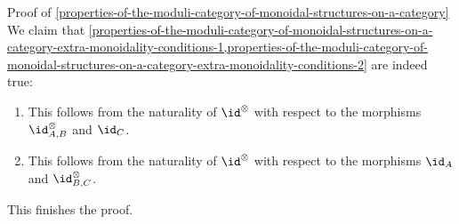 \begin{Proof}{Proof of \cref{properties-of-the-moduli-category-of-monoidal-structures-on-a-category}}%
    We claim that \cref{properties-of-the-moduli-category-of-monoidal-structures-on-a-category-extra-monoidality-conditions-1,properties-of-the-moduli-category-of-monoidal-structures-on-a-category-extra-monoidality-conditions-2} are indeed true:
    \begin{enumerate}
        \item{}This follows from the naturality of $\id^{\otimes}$ with respect to the morphisms $\id^{\otimes}_{A,B}$ and $\id_{C}$.
        \item{}This follows from the naturality of $\id^{\otimes}$ with respect to the morphisms $\id_{A}$ and $\id^{\otimes}_{B,C}$.
    \end{enumerate}
    This finishes the proof.


\end{Proof}

